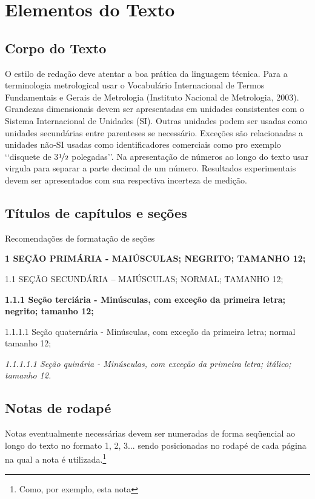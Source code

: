 \chapter[Elementos do Texto]{Elementos do Texto}
\section{Corpo do Texto}
O estilo de redação deve atentar a boa prática da linguagem técnica. Para a
terminologia metrological usar o Vocabulário Internacional de Termos
Fundamentais e Gerais de Metrologia\cite{inmetro2003} (Instituto Nacional de Metrologia,
2003).
Grandezas dimensionais devem ser apresentadas em unidades consistentes com
o Sistema Internacional de Unidades (SI). Outras unidades podem ser usadas
como unidades secundárias entre parenteses se necessário. Exceções são
relacionadas a unidades não-SI usadas como identificadores comerciais como
pro exemplo \lq\lq disquete de 3$\nicefrac{1}{2}$ polegadas\rq\rq.
Na apresentação de números ao longo do texto usar virgula para separar a
parte decimal de um número. Resultados experimentais devem ser apresentados
com sua respectiva incerteza de medição.
\section{Títulos de capítulos e seções}
Recomendações de formatação de seções
\begin{description}
\item \textbf{1 SEÇÃO PRIMÁRIA - MAIÚSCULAS; NEGRITO; TAMANHO 12;}
\item 1.1 SEÇÃO SECUNDÁRIA – MAIÚSCULAS; NORMAL; TAMANHO 12;
\item \textbf{1.1.1 Seção terciária - Minúsculas, com exceção da
primeira letra; negrito; tamanho 12;}
\item 1.1.1.1 Seção quaternária - Minúsculas, com exceção da primeira
letra; normal tamanho 12;
\item \textit{1.1.1.1.1 Seção quinária - Minúsculas, com exceção da
primeira letra; itálico; tamanho 12.}
\end{description}
\section{Notas de rodapé}
Notas eventualmente necessárias devem ser numeradas de forma seqüencial ao
longo do texto no formato 1, 2, 3... sendo posicionadas no rodapé de cada
página na qual a nota é utilizada.\footnote{Como, por exemplo, esta nota}
